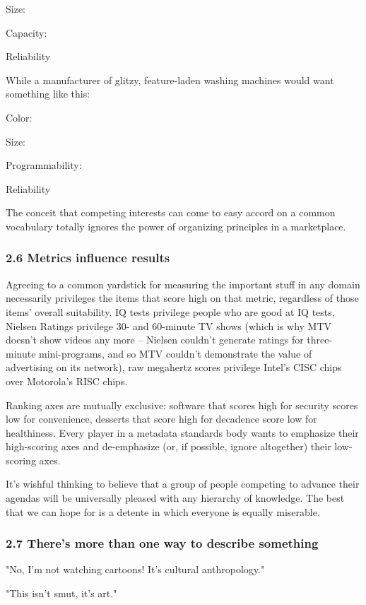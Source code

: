 Size:

Capacity:

Reliability

While a manufacturer of glitzy, feature-laden washing machines
would want something like this:

Color:

Size:

Programmability:

Reliability

The conceit that competing interests can come to easy accord on a
common vocabulary totally ignores the power of organizing
principles in a marketplace.

\subsubsection{2.6 Metrics influence results}

Agreeing to a common yardstick for measuring the important stuff in
any domain necessarily privileges the items that score high on that
metric, regardless of those items' overall suitability. IQ tests
privilege people who are good at IQ tests, Nielsen Ratings
privilege 30- and 60-minute TV shows (which is why MTV doesn't show
videos any more -- Nielsen couldn't generate ratings for
three-minute mini-programs, and so MTV couldn't demonstrate the
value of advertising on its network), raw megahertz scores
privilege Intel's CISC chips over Motorola's RISC chips.

Ranking axes are mutually exclusive: software that scores high for
security scores low for convenience, desserts that score high for
decadence score low for healthiness. Every player in a metadata
standards body wants to emphasize their high-scoring axes and
de-emphasize (or, if possible, ignore altogether) their low-scoring
axes.

It's wishful thinking to believe that a group of people competing
to advance their agendas will be universally pleased with any
hierarchy of knowledge. The best that we can hope for is a detente
in which everyone is equally miserable.

\subsubsection{2.7 There's more than one way to describe something}

"No, I'm not watching cartoons! It's cultural anthropology."

"This isn't smut, it's art."

